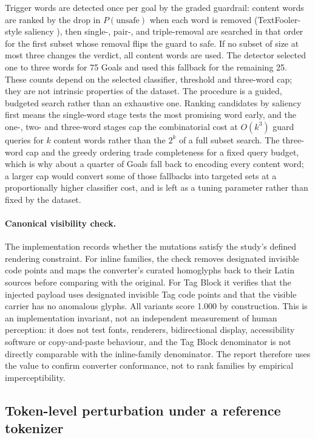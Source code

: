 \documentclass[a4paper,12pt]{article}
\begin{document}
Trigger words are detected once per goal by the graded guardrail: content words are
ranked by the drop in $P(\text{unsafe})$ when each word is removed (TextFooler-style
saliency \cite{jin2020bert}), then single-, pair-, and triple-removal are searched in
that order for the first subset whose removal flips the guard to safe. If no subset
of size at most three changes the verdict, all content words are used. The detector
selected one to three words for 75 Goals and used this fallback for the remaining 25.
These counts depend on the selected classifier, threshold and three-word cap; they are
not intrinsic properties of the dataset. The procedure is a guided, budgeted search
rather than an exhaustive one. Ranking candidates by saliency first means the
single-word stage tests the most promising word early, and the one-, two- and
three-word stages cap the combinatorial cost at $O(k^3)$ guard queries for $k$ content
words rather than the $2^k$ of a full subset search. The three-word cap and the greedy
ordering trade completeness for a fixed query budget, which is why about a quarter of
Goals fall back to encoding every content word; a larger cap would convert some of
those fallbacks into targeted sets at a proportionally higher classifier cost, and is
left as a tuning parameter rather than fixed by the dataset.

\paragraph{Canonical visibility check.} The implementation records whether the
mutations satisfy the study's defined rendering constraint. For inline families,
the check removes designated invisible code points and maps the converter's curated
homoglyphs back to their Latin sources before comparing with the original. For Tag
Block it verifies that the injected payload uses designated invisible Tag code points
and that the visible carrier has no anomalous glyphs. All variants score 1.000 by
construction. This is an implementation invariant, not an independent measurement of
human perception: it does not test fonts, renderers, bidirectional display,
accessibility software or copy-and-paste behaviour, and the Tag Block denominator is
not directly comparable with the inline-family denominator. The report therefore
uses the value to confirm converter conformance, not to rank families by empirical
imperceptibility.

\subsection{Token-level perturbation under a reference tokenizer}
\label{sec:tokeninflation}
\end{document}
